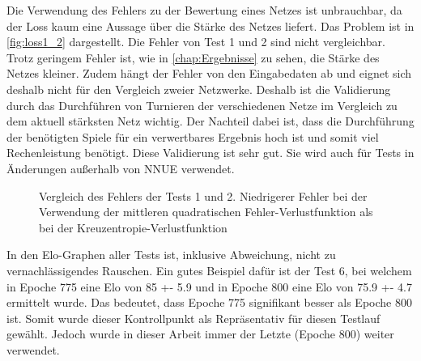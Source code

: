Die Verwendung des Fehlers zu der Bewertung eines Netzes ist unbrauchbar, da der Loss kaum eine Aussage über die Stärke des Netzes liefert. Das Problem ist in \autoref{fig:loss1_2} dargestellt. Die Fehler von Test 1 und 2 sind nicht vergleichbar. Trotz geringem Fehler ist, wie in \autoref{chap:Ergebnisse} zu sehen, die Stärke des Netzes kleiner. Zudem hängt der Fehler von den Eingabedaten ab und eignet sich deshalb nicht für den Vergleich zweier Netzwerke. Deshalb ist die Validierung durch das Durchführen von Turnieren der verschiedenen Netze im Vergleich zu dem aktuell stärksten Netz wichtig. Der Nachteil dabei ist, dass die Durchführung der benötigten Spiele für ein verwertbares Ergebnis hoch ist und somit viel Rechenleistung benötigt. Diese Validierung ist sehr gut. Sie wird auch für Tests in Änderungen außerhalb von \ac{NNUE} verwendet.

\begin{figure}
  \centering
  \caption{Vergleich des Fehlers der Tests 1 und 2. Niedrigerer Fehler bei der Verwendung der mittleren quadratischen Fehler-Verlustfunktion als bei der Kreuzentropie-Verlustfunktion}
  \label{fig:loss1_2}
\end{figure}

In den Elo-Graphen aller Tests ist, inklusive Abweichung, nicht zu vernachlässigendes Rauschen. Ein gutes Beispiel dafür ist der Test 6, bei welchem in Epoche 775 eine Elo von 85 +- 5.9 und in Epoche 800 eine Elo von 75.9 +- 4.7 ermittelt wurde. Das bedeutet, dass Epoche 775 signifikant besser als Epoche 800 ist. Somit wurde dieser Kontrollpunkt als Repräsentativ für diesen Testlauf gewählt. Jedoch wurde in dieser Arbeit immer der Letzte (Epoche 800) weiter verwendet.

